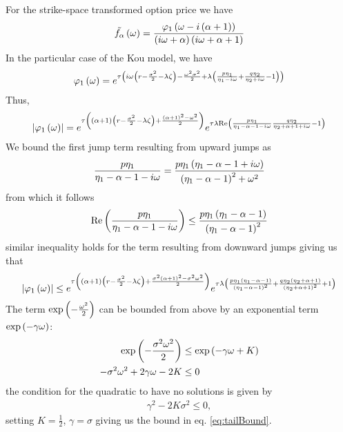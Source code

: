 \documentclass[11pt]{amsart}
\begin{document}
For the strike-space transformed option price we have
\begin{align*}
\tilde {f_{\alpha}} \left( {\omega} \right)
=
\frac{\varphi_{1} \left( {{\omega - i \left( {\alpha + 1} \right)}} \right)}{\left( {i \omega + \alpha} \right) \left( {i \omega + \alpha + 1} \right)}
\end{align*}
In the particular case of the Kou model, we have 
\begin{align*}
\varphi_{1} \left( {{\omega}} \right)
=
e^{\tau
\left( {
i \omega \left( {r - \frac{\sigma^2}{2} - \lambda \zeta} \right)
- \frac{\omega^2 \sigma^2}{2}
+ \lambda
\left( {
\frac{p \eta_1 }{\eta_1 - i \omega}
+\frac{q \eta_2}{\eta_2 + i \omega}
-1
} \right)
} \right)
}
\end{align*}
Thus,
\begin{align*}
\left| { \varphi_{1} \left( {{\omega}} \right)} \right|
=
e^{
\tau
\left( { 
\left( {\alpha+1} \right)
\left( {r - \frac{\sigma^2}{2} - \lambda \zeta} \right)
+
\frac{\left( {\alpha+1} \right)^2 - \omega^2}{2}
} \right)
}
e^{ \tau \lambda \mathrm{Re} \left( {
\frac{p \eta_1}{\eta_1-\alpha-1 - i \omega}
\frac{q \eta_2}{\eta_2 +\alpha +1 + i \omega}
-1
 } \right)}
\end{align*}
We bound the first jump term resulting from upward jumps as
\begin{align*}
\frac{p \eta_1}{ \eta_1 - \alpha -1 - i \omega}
= \frac{p \eta_1 \left( {\eta_1 - \alpha -1 +i \omega} \right)}{\left( {\eta_1 - \alpha -1} \right)^2 + \omega^2}
\end{align*}
from which it follows
\begin{align*}
\mathrm{Re}
\left( {
\frac{p \eta_1}{ \eta_1 - \alpha -1 - i \omega}
} \right)
\leq
\frac{p \eta_1 \left( {\eta_1 - \alpha -1 } \right)}{\left( {\eta_1 - \alpha -1} \right)^2 }
\end{align*}
similar inequality holds for the term resulting from downward jumps giving us
that
\begin{align*}
\left| { \varphi_{1} \left( {{\omega}} \right)} \right|
\leq 
e^{
\tau
\left( { 
\left( {\alpha+1} \right)
\left( {r - \frac{\sigma^2}{2} - \lambda \zeta} \right)
+
\frac{ \sigma^2 \left( {\alpha+1} \right)^2 - \sigma^2 \omega^2}{2}
} \right)
}
e^{
\tau \lambda
\left( {
\frac{p \eta_1 \left( {\eta_1 - \alpha -1} \right)}{ \left( {\eta_1 -\alpha -1} \right)^2}
+
\frac{q \eta_2 \left( {\eta_2 + \alpha +1} \right)}{\left( {\eta_2+ \alpha +1} \right)^2}
+1
} \right)
}
\end{align*}
The term $\mathrm{exp}\left ( {- \frac{\omega^2}{2}}\right )$ can be bounded from above
by an exponential term $\mathrm{exp}\left ( {-\gamma \omega}\right )$:
\begin{align}
\mathrm{exp}\left ( {- \frac{\sigma^2 \omega^2}{2}}\right )
\label{eq:tailBound}
& \leq
\mathrm{exp}\left ( {-\gamma \omega+ K}\right )
\\
- \sigma^2 \omega^2 + 2 \gamma \omega - 2 K & \leq 0
\nonumber
\end{align}
the condition for the quadratic to have no solutions
is given by
\begin{align*}
 \gamma^2 - 2 K  \sigma^2 \leq 0,
\end{align*}
setting $K =\frac{1}{2}$, $\gamma = \sigma$
giving us the bound in eq. \eqref{eq:tailBound}.
\end{document}
